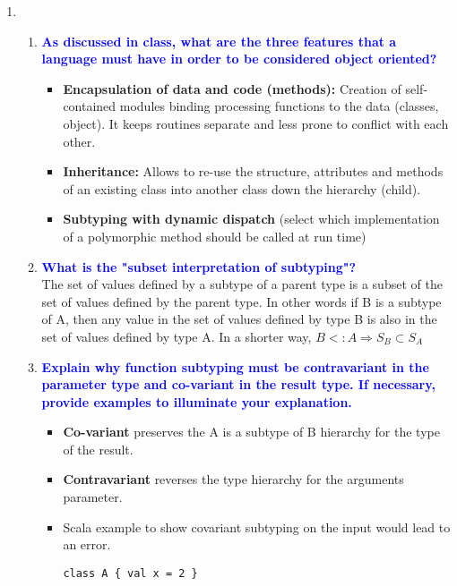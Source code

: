 \documentclass[10pt]{article}
\begin{document}
\begin{enumerate}
    
    \item
    \begin{enumerate}
        \item \textbf{\textcolor{blue}{As discussed in class, what are the three features that a language must have in order to be considered object oriented?}}
            \begin{itemize}
                \item \textbf{Encapsulation of data and code (methods):} Creation of self-contained modules binding processing functions to the data (classes, object). It keeps routines separate and less prone to conflict with each other.
                \item \textbf{Inheritance:} Allows to re-use the structure, attributes and methods of an existing class into another class down the hierarchy (child).
                \item \textbf{Subtyping with dynamic dispatch} (select which implementation of a polymorphic method should be called at run time) 
            \end{itemize}
        \item \textbf{\textcolor{blue}{What is the "subset interpretation of subtyping"?}}
            \\ The set of values defined by a subtype of a parent type is a subset of the set of values defined by the parent type. In other words if B is a subtype of A, then any value in the set of values defined by type B is also in the set of values defined by type A. In a shorter way, $B <: A \Rightarrow S_B \subset S_A$
        \item \textbf{\textcolor{blue}{Explain why function subtyping must be contravariant in the parameter type and co-variant in the result type. If necessary, provide examples to illuminate your explanation.}}
            \begin{itemize}
                \item \textbf{Co-variant} preserves the A is a subtype of B hierarchy for the type of the result.
                \item \textbf{Contravariant} reverses the type hierarchy for the arguments parameter.
            \end{itemize}
            \begin{itemize}
                \item Scala example to show covariant subtyping on the input would lead to an error.
                \begin{verbatim}
class A { val x = 2 }

\end{verbatim}
\end{itemize}
\end{enumerate}
\end{enumerate}
\end{document}
